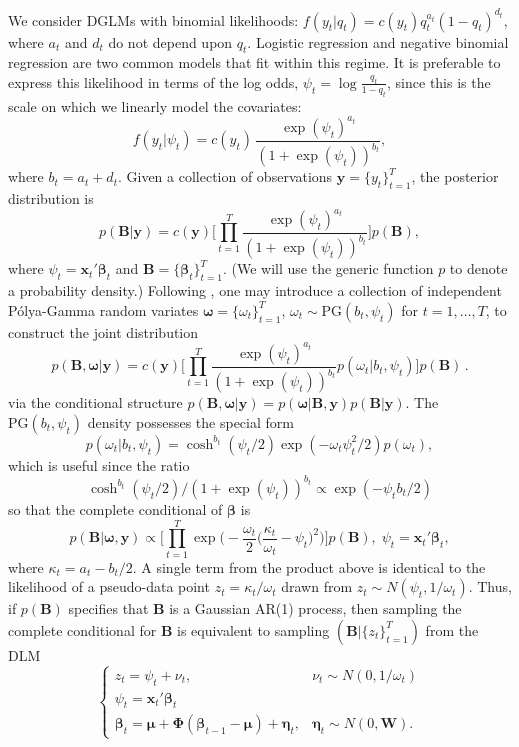 \documentclass[12pt]{article}
\newcommand{\Polya}{P\'{o}lya}
\newcommand{\PG}{\text{PG}}
\newcommand{\bbeta}{\boldsymbol{\beta}}
\newcommand{\oomega}{\boldsymbol{\omega}}
\newcommand{\yy}{\boldsymbol{y}}
\newcommand{\vx}{\boldsymbol{x}}
\newcommand{\betap}{{\boldsymbol{B}}}
\newcommand{\bW}{\boldsymbol{W}}
\newcommand{\bPhi}{\boldsymbol{\Phi}}
\newcommand{\bmu}{\boldsymbol{\mu}}
\newcommand{\veta}{\boldsymbol{\eta}}
\begin{document}
We consider DGLMs with binomial likelihoods: \( f(y_t | q_t) = c(y_t) q_t^{a_t}
(1-q_t)^{d_t}, \) where $a_t$ and $d_t$ do not depend upon $q_t$.  Logistic
regression and negative binomial regression are two common models that fit
within this regime.  It is preferable to express this likelihood in terms of the
log odds, $\psi_t = \log \frac{q_t}{1-q_t}$, since this is the scale on which we
linearly model the covariates:
\[
f(y_t | \psi_t) = c(y_t) \, \frac{\exp(\psi_t)^{a_t}}{(1+\exp(\psi_t))^{b_t}},
\]
where $b_t = a_t + d_t$.  Given a collection of observations $\yy =
\{y_t\}_{t=1}^T$, the posterior distribution is
\[
p(\betap | \yy) = c(\yy) \Big[ \prod_{t=1}^T
\frac{\exp({\psi_t})^{a_t}}{(1+\exp({\psi_t}))^{b_t}}
\Big] p(\betap),
\]
where $\psi_t = \vx_t' \bbeta_t$ and $\betap = \{\bbeta_t\}_{t=1}^T$.  (We will use
the generic function $p$ to denote a probability density.)  Following
\cite{polson-etal-2013}, one may introduce a collection of independent
\Polya-Gamma random variates $\oomega = \{\omega_t\}_{t=1}^T$, $\omega_t \sim
\PG(b_t, \psi_t)$ for $t=1, \ldots, T$, to construct the joint distribution
\[
p(\betap, \oomega | \yy) = c(\yy) \Big[ \prod_{t=1}^T
\frac{\exp({\psi_t})^{a_t}}{(1+\exp({\psi_t}))^{b_t}} p(\omega_t | b_t, \psi_t)
\Big] p(\betap) \, .
\]
via the conditional structure $p(\betap, \oomega | \yy) = p(\oomega | \betap,
\yy) p(\betap | \yy)$.  The $\PG{}(b_t, \psi_t)$ density possesses the special
form
\[
p(\omega_t | b_t, \psi_t) = \cosh^{b_t}(\psi_t/2) \exp({- \omega_t \psi_t^2 / 2})
p(\omega_t),
\]
which is useful since the ratio
\begin{equation}
  \label{eqn:pg-cancellation}
  \cosh^{b_t}(\psi_t/2) / (1+\exp({\psi_t}))^{b_t}
  \propto
  \exp({-\psi_t b_t/2}) 
\end{equation}
so that the complete conditional of $\bbeta$ is
\[
p(\betap | \oomega, \yy) \propto \Big[ \prod_{t=1}^T \exp \Big(-\frac{\omega_t}{2}
\Big(\frac{\kappa_t}{\omega_t} - \psi_t\Big)^2 \Big) \Big] p(\betap), \; \psi_t
= \vx_t' \bbeta_t,
\]
where $\kappa_t = a_t - b_t / 2$.  A single term from the product above is
identical to the likelihood of a pseudo-data point $z_t = \kappa_t / \omega_t$
drawn from $z_t \sim N(\psi_t, 1/\omega_t)$.  Thus, if $p(\betap)$ specifies
that $\betap$ is a Gaussian AR(1) process, then sampling the complete
conditional for $\betap$ is equivalent to sampling $(\betap | \{z_t\}_{t=1}^T)$
from the DLM
\[
\begin{cases}
  z_t = \psi_t + \nu_t, & \nu_t \sim N(0, 1/\omega_t) \\
  \psi_t = \vx_t' \bbeta_t \\
  \bbeta_t = \bmu + \bPhi (\bbeta_{t-1} - \bmu) + \veta_t, & \veta_t \sim N(0, \bW).
\end{cases}
\]
\end{document}
